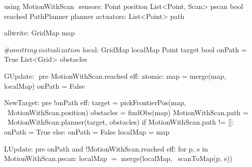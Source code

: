 using MotionWithScan $\label{moddef}$
    sensors:
        Point position
        List<Point, Scan> pscan
        bool reached
        PathPlanner planner
    actuators:
        List<Point> path

allwrite:$\label{awvar}$
    GridMap map

#$\mathit{omitting\ initialization}$
local:
   GridMap localMap
   Point target
   bool onPath = True
   List<Grid> obstacles

GUpdate: $\label{gup}$
  pre MotionWithScan.reached
  eff: atomic:
    map = merge(map, localMap)
    onPath = False

NewTarget:$\label{newpt}$
  pre !onPath
  eff:
     target = pickFrontierPos(map, \
                         MotionWithScan.position)
     obstacles = findObs(map)
     MotionWithScan.path = \
        MotionWithScan.planner(target, obstacles)
     if MotionWithScan.path != []:
        onPath = True
     else:
        onPath = False
     localMap = map

LUpdate:$\label{lup}$
   pre onPath and !MotionWithScan.reached
   eff:
      for p, s in MotionWithScan.pscan:
         localMap $=$ merge(localMap, \
                             scanToMap(p, s))
